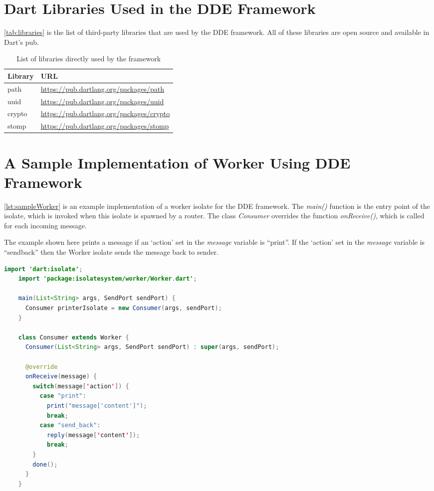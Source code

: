 \section{Dart Libraries Used in the DDE Framework}
\autoref{tab:libraries} is the list of third-party libraries that are used by the DDE framework. All of these libraries are open source and available in Dart's pub.

\begin{table}[htsb]
  \caption[Dependent libraries of the framework]{List of libraries directly used by the framework}\label{tab:libraries}
  \centering
  \begin{tabular}{l l}
    \toprule
      \bf{Library} & \bf{URL} \\
    \midrule
      path &  \url{https://pub.dartlang.org/packages/path}\\
      uuid &  \url{https://pub.dartlang.org/packages/uuid}\\
      crypto &  \url{https://pub.dartlang.org/packages/crypto}\\
      stomp &  \url{https://pub.dartlang.org/packages/stomp}\\
    \bottomrule
  \end{tabular}
\end{table}

\section{A Sample Implementation of Worker Using DDE Framework}
\autoref{lst:sampleWorker} is an example implementation of a worker isolate for the DDE framework. The \emph{main()} function is the entry point of the isolate, which is invoked when this isolate is spawned by a router. The class \emph{Consumer} overrides the function \emph{onReceive()}, which is called for each incoming message.

  The example shown here prints a message if an ‘action’
 set in the \emph{message} variable is “print”. If the ‘action’ set in the \emph{message} variable is “send\textunderscore{}back” then the Worker isolate sends the message back to sender.

\begin{lstlisting}[language=java,firstnumber=1, caption=A sample Worker isolate that can be deployed in the framework, label=lst:sampleWorker]
    import 'dart:isolate';
    import 'package:isolatesystem/worker/Worker.dart';

    main(List<String> args, SendPort sendPort) {
      Consumer printerIsolate = new Consumer(args, sendPort);
    }

    class Consumer extends Worker {
      Consumer(List<String> args, SendPort sendPort) : super(args, sendPort);

      @override
      onReceive(message) {
        switch(message['action']) {
          case "print":
            print("message['content']");
            break;
          case "send_back":
            reply(message['content']);
            break;
        }
        done();
      }
    }

\end{lstlisting}
